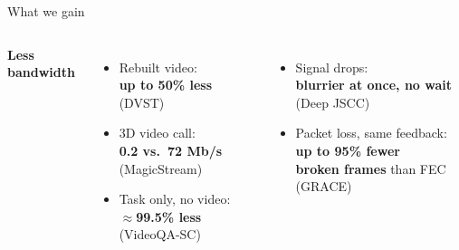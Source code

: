\begin{frame}{What we gain}
  \vspace{0.8em}
  \begin{columns}[T,onlytextwidth]
      {\Large\textbf{\textcolor{softgreen}{Less bandwidth}}\par}
      \vspace{0.6em}
      \begin{itemize}[<+->]\itemsep7pt
        \item Rebuilt video:\\ \textbf{up to 50\% less}
          {\scriptsize\textcolor{softgray}{(DVST)}}
        \item 3D video call:\\ \textbf{0.2 vs.\ 72 Mb/s}
          {\scriptsize\textcolor{softgray}{(MagicStream)}}
        \item Task only, no video:\\ \textbf{$\approx$99.5\% less}
          {\scriptsize\textcolor{softgray}{(VideoQA-SC)}}
      \end{itemize}
      \vspace{0.6em}
      \begin{itemize}[<+->]\itemsep7pt
        \item Signal drops:\\ \textbf{blurrier at once, no wait}
          {\scriptsize\textcolor{softgray}{(Deep JSCC)}}
        \item Packet loss, same feedback:\\ \textbf{up to 95\% fewer}\\
          \textbf{broken frames} than FEC {\scriptsize\textcolor{softgray}{(GRACE)}}
      \end{itemize}
  \end{columns}

  \vspace{1.0em}
  \centering

  \vspace{0.4em}
\end{frame}
